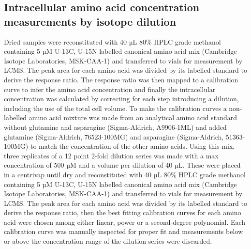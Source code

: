 \documentclass[9pt,lineno]{elife}
\begin{document}
\subsection{Intracellular amino acid concentration measurements by isotope dilution}
Dried samples were reconstituted with 40 µL 80\% HPLC grade methanol containing 5 µM U-13C, U-15N labelled canonical amino acid mix (Cambridge Isotope Laboratories, MSK-CAA-1) and transferred to vials for measurement by LCMS.
The peak area for each amino acid was divided by its labelled standard to derive the response ratio.
The response ratio was then mapped to a calibration curve to infer the amino acid concentration and finally the intracellular concentration was calculated by correcting for each step introducing a dilution, including the use of the total cell volume.
To make the calibration curves a non-labelled amino acid mixture was made from an analytical amino acid standard without glutamine and asparagine (Sigma-Aldrich, A9906-1ML) and added glutamine (Sigma-Aldrich, 76523-100MG) and asparagine (Sigma-Aldrich, 51363-100MG) to match the concentration of the other amino acids.
Using this mix, three replicates of a 12 point 2-fold dilution series was made with a max concentration of 500 µM and a volume per dilution of 40 µL.
These were placed in a centrivap until dry and reconstituted with 40 µL 80\% HPLC grade methanol containing 5 µM U-13C, U-15N labelled canonical amino acid mix (Cambridge Isotope Laboratories, MSK-CAA-1) and transferred to vials for measurement by LCMS.
The peak area for each amino acid was divided by its labelled standard to derive the response ratio, then the best fitting calibration curves for each amino acid were chosen among either linear, power or a second-degree polynomial.
Each calibration curve was manually inspected for proper fit and measurements below or above the concentration range of the dilution series were discarded.
\end{document}
